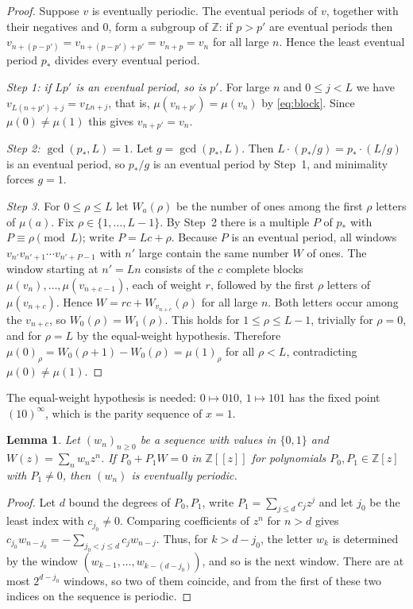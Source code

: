 \documentclass[11pt,reqno]{amsart}
\newtheorem{lemma}[theorem]{Lemma}
\theoremstyle{definition}
\theoremstyle{remark}
\newcommand{\Z}{\mathbb{Z}}
\begin{document}
\begin{proof}
Suppose $v$ is eventually periodic.  The eventual periods of $v$, together
with their negatives and $0$, form a subgroup of $\Z$: if $p>p'$ are
eventual periods then $v_{n+(p-p')}=v_{n+(p-p')+p'}=v_{n+p}=v_n$ for all
large $n$.  Hence the least eventual period $p_*$ divides every eventual
period.

\emph{Step 1: if $Lp'$ is an eventual period, so is $p'$.}  For large $n$
and $0\le j<L$ we have $v_{L(n+p')+j}=v_{Ln+j}$, that is,
$\mu(v_{n+p'})=\mu(v_n)$ by \eqref{eq:block}.  Since $\mu(0)\ne\mu(1)$ this
gives $v_{n+p'}=v_n$.

\emph{Step 2: $\gcd(p_*,L)=1$.}  Let $g=\gcd(p_*,L)$.  Then
$L\cdot(p_*/g)=p_*\cdot(L/g)$ is an eventual period, so $p_*/g$ is an
eventual period by Step~1, and minimality forces $g=1$.

\emph{Step 3.}  For $0\le\rho\le L$ let $W_a(\rho)$ be the number of ones
among the first $\rho$ letters of $\mu(a)$.  Fix $\rho\in\{1,\dots,L-1\}$.
By Step~2 there is a multiple $P$ of $p_*$ with $P\equiv\rho\pmod L$; write
$P=Lc+\rho$.  Because $P$ is an eventual period, all windows
$v_{n'}v_{n'+1}\cdots v_{n'+P-1}$ with $n'$ large contain the same number
$W$ of ones.  The window starting at $n'=Ln$ consists of the $c$ complete
blocks $\mu(v_n),\dots,\mu(v_{n+c-1})$, each of weight $r$, followed by the
first $\rho$ letters of $\mu(v_{n+c})$.  Hence $W=rc+W_{v_{n+c}}(\rho)$ for
all large $n$.  Both letters occur among the $v_{n+c}$, so
$W_0(\rho)=W_1(\rho)$.  This holds for $1\le\rho\le L-1$, trivially for
$\rho=0$, and for $\rho=L$ by the equal-weight hypothesis.  Therefore
$\mu(0)_\rho=W_0(\rho+1)-W_0(\rho)=\mu(1)_\rho$ for all $\rho<L$,
contradicting $\mu(0)\ne\mu(1)$.
\end{proof}

The equal-weight hypothesis is needed: $0\mapsto 010$, $1\mapsto 101$ has
the fixed point $(10)^{\infty}$, which is the parity sequence of $x=1$.

\begin{lemma}\label{lem:rational}
Let $(w_n)_{n\ge 0}$ be a sequence with values in $\{0,1\}$ and
$W(z)=\sum_nw_nz^n$.  If $P_0+P_1W=0$ in $\Z[[z]]$ for polynomials
$P_0,P_1\in\Z[z]$ with $P_1\ne 0$, then $(w_n)$ is eventually periodic.
\end{lemma}

\begin{proof}
Let $d$ bound the degrees of $P_0,P_1$, write $P_1=\sum_{j\le d}c_jz^j$ and
let $j_0$ be the least index with $c_{j_0}\ne 0$.  Comparing coefficients of
$z^{n}$ for $n>d$ gives
$c_{j_0}w_{n-j_0}=-\sum_{j_0<j\le d}c_jw_{n-j}$.  Thus, for
$k>d-j_0$, the letter $w_k$ is determined by the window
$(w_{k-1},\dots,w_{k-(d-j_0)})$, and so is the next window.  There are at
most $2^{d-j_0}$ windows, so two of them coincide, and from the first of
these two indices on the sequence is periodic.
\end{proof}
\end{document}
